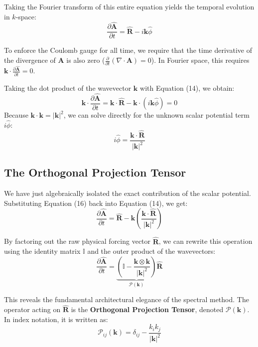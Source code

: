 \documentclass[11pt, a4paper]{article}
\begin{document}
Taking the Fourier transform of this entire equation yields the temporal evolution in $k$-space:
\begin{equation}
    \frac{\partial \hat{\mathbf{A}}}{\partial t} = \hat{\mathbf{R}} - i\mathbf{k}\hat{\phi}
\end{equation}

To enforce the Coulomb gauge for all time, we require that the time derivative of the divergence of $\mathbf{A}$ is also zero ($\frac{\partial}{\partial t}(\nabla \cdot \mathbf{A}) = 0$). In Fourier space, this requires $\mathbf{k} \cdot \frac{\partial \hat{\mathbf{A}}}{\partial t} = 0$. 

Taking the dot product of the wavevector $\mathbf{k}$ with Equation (14), we obtain:
\begin{equation}
    \mathbf{k} \cdot \frac{\partial \hat{\mathbf{A}}}{\partial t} = \mathbf{k} \cdot \hat{\mathbf{R}} - \mathbf{k} \cdot (i\mathbf{k}\hat{\phi}) = 0
\end{equation}
Because $\mathbf{k} \cdot \mathbf{k} = |\mathbf{k}|^2$, we can solve directly for the unknown scalar potential term $i\hat{\phi}$:
\begin{equation}
    i\hat{\phi} = \frac{\mathbf{k} \cdot \hat{\mathbf{R}}}{|\mathbf{k}|^2}
\end{equation}

\subsection{The Orthogonal Projection Tensor}
We have just algebraically isolated the exact contribution of the scalar potential. Substituting Equation (16) back into Equation (14), we get:
\begin{equation}
    \frac{\partial \hat{\mathbf{A}}}{\partial t} = \hat{\mathbf{R}} - \mathbf{k} \left( \frac{\mathbf{k} \cdot \hat{\mathbf{R}}}{|\mathbf{k}|^2} \right)
\end{equation}

By factoring out the raw physical forcing vector $\hat{\mathbf{R}}$, we can rewrite this operation using the identity matrix $\mathbb{I}$ and the outer product of the wavevectors:
\begin{equation}
    \frac{\partial \hat{\mathbf{A}}}{\partial t} = \underbrace{\left( \mathbb{I} - \frac{\mathbf{k} \otimes \mathbf{k}}{|\mathbf{k}|^2} \right)}_{\mathcal{P}(\mathbf{k})} \hat{\mathbf{R}}
\end{equation}

This reveals the fundamental architectural elegance of the spectral method. The operator acting on $\hat{\mathbf{R}}$ is the \textbf{Orthogonal Projection Tensor}, denoted $\mathcal{P}(\mathbf{k})$. In index notation, it is written as:
\begin{equation}
    \mathcal{P}_{ij}(\mathbf{k}) = \delta_{ij} - \frac{k_i k_j}{|\mathbf{k}|^2}
\end{equation}
\end{document}
